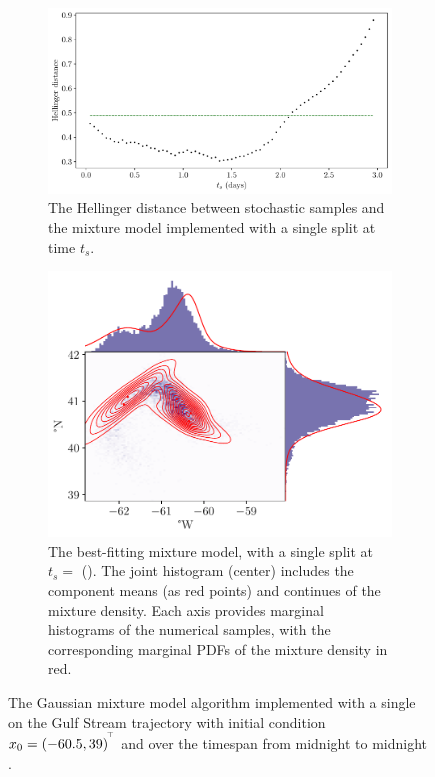 \begin{figure}
	\begin{center}
		\begin{subfigure}{\textwidth}
			\includegraphics[width=\textwidth]{chp06_applications/figures/gulf_stream/hell_dist_split}
			\caption{The Hellinger distance between stochastic samples and the mixture model implemented with a single split at time \(t_s\).}
			\label{fig:na_1split_hell}
		\end{subfigure}
		\begin{subfigure}{\textwidth}
			\includegraphics[width=\textwidth]{chp06_applications/figures/gulf_stream/gmm_split_best}
			\caption{The best-fitting mixture model, with a single split at \(t_s = \) ().
				The joint histogram (center) includes the component means (as red points) and continues of the mixture density.
				Each axis provides marginal histograms of the numerical samples, with the corresponding marginal PDFs of the mixture density in red.}
			\label{fig:na_1split_best}
		\end{subfigure}
		\caption{The Gaussian mixture model algorithm implemented with a single on the Gulf Stream trajectory with initial condition \(x_0 = \left(-60.5, 39\right)^{^{\!\top}}\) and over the timespan from midnight  to midnight .}
		\label{fig:na_1split}
	\end{center}
\end{figure}


